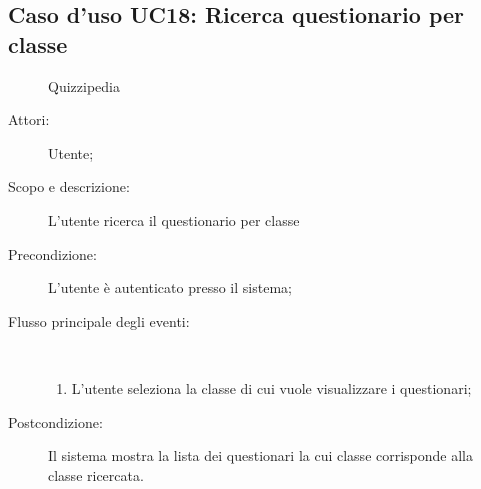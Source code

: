 \subsection{Caso d'uso UC18: Ricerca questionario per classe}
	\begin{figure}[H]
		\centering
		\begin{resizedtikzpicture}{\textwidth}
		\begin{umlsystem}[x=0, fill=lightgray!20]{Quizzipedia}
		\end{umlsystem}
		\end{resizedtikzpicture}
		\caption{}
	\end{figure}
\begin{description}
\item[Attori:] Utente;
\item[Scopo e descrizione:] L'utente ricerca il questionario per classe
      \item[Precondizione:] L'utente è autenticato presso il sistema;

        \item[Flusso principale degli eventi:] \ 
 \begin{enumerate}
          \item L'utente seleziona la classe di cui vuole visualizzare i questionari;

      \end{enumerate}
    \item[Postcondizione:] Il sistema mostra la lista dei questionari la cui classe corrisponde alla classe ricercata.
  \end{description}
\hypertarget{UC19}{}
